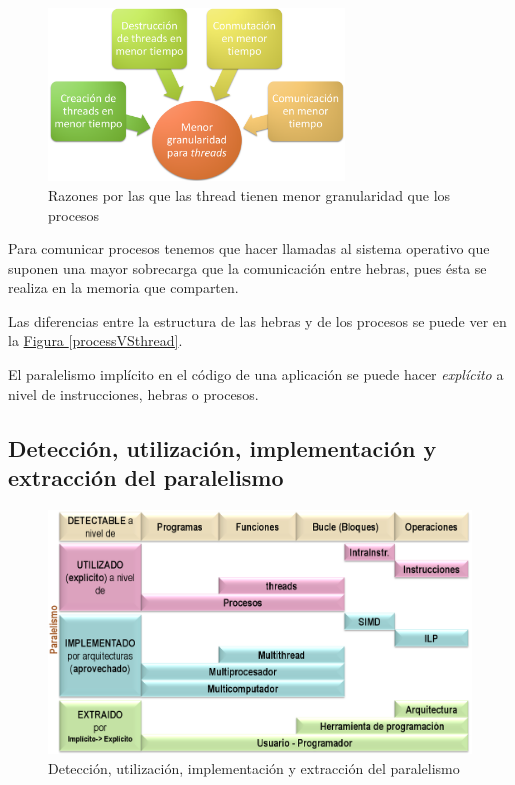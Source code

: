 \documentclass[10pt,a4paper,spanish]{report}
\begin{document}
\begin{figure}[!h]
\centering
\includegraphics[width=0.7\textwidth]{6}
\caption{Razones por las que las thread tienen menor granularidad que los procesos}
\label{granularidad_hebras}
\end{figure}

Para comunicar procesos tenemos que hacer llamadas al sistema operativo que suponen una mayor sobrecarga que la comunicación entre hebras, pues ésta se realiza en la memoria que comparten.

Las diferencias entre la estructura de las hebras y de los procesos se puede ver en la \hyperref[processVSthread]{Figura \ref*{processVSthread}}.

El paralelismo implícito en el código de una aplicación se puede hacer \textit{\textcolor[rgb]{0.2,0.4,0.8}{explícito}} a nivel de instrucciones, hebras o procesos.

\textcolor[rgb]{0.2,0.4,0.8}{\subsection{Detección, utilización, implementación y extracción del paralelismo}}
\begin{figure}[!h]
\centering
\includegraphics[width=1\textwidth]{7}
\caption{Detección, utilización, implementación y extracción del paralelismo}
\label{resumen}
\end{figure}
\end{document}
